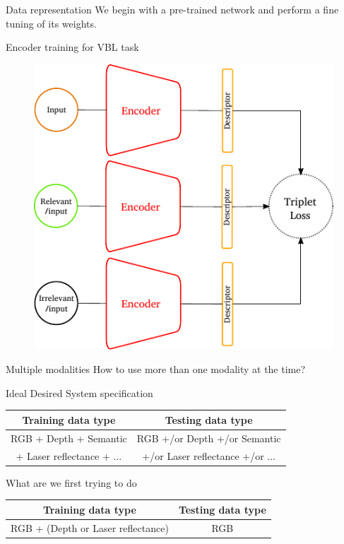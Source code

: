\begin{frame}{Data representation}
	We begin with a pre-trained network and perform a fine tuning of its weights.
	\begin{block}{Encoder training for VBL task}
		\begin{figure}[c]
			\includegraphics[width=0.5\linewidth]{vect/encoder_training.pdf}					
		\end{figure}
	\end{block}
\end{frame}

\begin{frame}{Multiple modalities}
	How to use more than one modality at the time?
	\vfill
	\begin{block}{Ideal Desired System specification}
		\centering
		\begin{tabular}{c | c}
			\textbf{Training data type} & \textbf{Testing data type} \\
			\hline
			RGB + Depth + Semantic & RGB +/or Depth +/or Semantic  \\
			+ Laser reflectance + ... &	+/or Laser reflectance +/or ... \\
		\end{tabular}
	\end{block}
	\vfill
	\begin{block}{What are we first trying to do}
		\centering
		\begin{tabular}{c | c}
			\textbf{Training data type} & \textbf{Testing data type} \\
			\hline
			RGB + (Depth or Laser reflectance)  & RGB  \\
		\end{tabular}
	\end{block}
\end{frame}